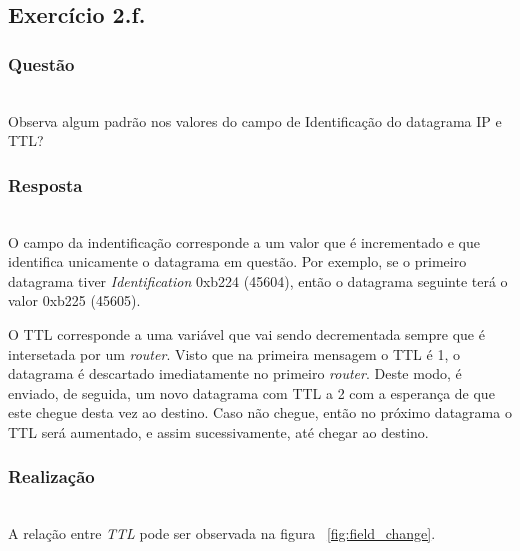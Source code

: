 \documentclass{llncs}
\begin{document}

\subsection{Exercício 2.f.}
\subsubsection{Questão}\rule[-10pt]{0pt}{10pt}\\

Observa algum padrão nos valores do campo de Identificação do datagrama IP e TTL? 

\subsubsection{Resposta}\rule[-10pt]{0pt}{10pt}\\

O campo da indentificação corresponde a um valor que é incrementado e que identifica unicamente o datagrama em questão. Por exemplo, se o primeiro datagrama tiver \textit{Identification} 0xb224 (45604), então o datagrama seguinte terá o valor 0xb225 (45605). 

O TTL corresponde a uma variável que vai sendo decrementada sempre que é intersetada por um \textit{router}. Visto que na primeira mensagem o TTL é 1, o datagrama é descartado imediatamente no primeiro \textit{router}. Deste modo, é enviado, de seguida, um novo datagrama com TTL a 2 com a esperança de que este chegue desta vez ao destino. Caso não chegue, então no próximo datagrama o TTL será aumentado, e assim sucessivamente, até chegar ao destino.

\subsubsection{Realização}\rule[-10pt]{0pt}{10pt}\\

A relação entre \textit{TTL} pode ser observada na figura ~\ref{fig:field_change}.
\end{document}
